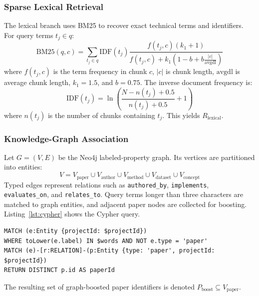 \documentclass[conference]{IEEEtran}
\begin{document}


\subsubsection{Sparse Lexical Retrieval}
The lexical branch uses BM25 to recover exact technical terms and identifiers. For query terms $t_j \in q$:
\begin{equation}
\mathrm{BM25}(q, c) = \sum_{t_j \in q} \mathrm{IDF}(t_j) \frac{f(t_j, c)(k_1 + 1)}{f(t_j, c) + k_1\left(1 - b + b\frac{|c|}{\mathrm{avgdl}}\right)}
\label{eq:bm25}
\end{equation}
where $f(t_j, c)$ is the term frequency in chunk $c$, $|c|$ is chunk length, $\mathrm{avgdl}$ is average chunk length, $k_1 = 1.5$, and $b = 0.75$. The inverse document frequency is:
\begin{equation}
\mathrm{IDF}(t_j) = \ln\left(\frac{N - n(t_j) + 0.5}{n(t_j) + 0.5} + 1\right)
\label{eq:idf}
\end{equation}
where $n(t_j)$ is the number of chunks containing $t_j$. This yields $R_{\mathrm{lexical}}$.

\subsubsection{Knowledge-Graph Association}
Let $G = (V, E)$ be the Neo4j labeled-property graph. Its vertices are partitioned into entities:
\begin{equation}
V = V_{\mathrm{paper}} \cup V_{\mathrm{author}} \cup V_{\mathrm{method}} \cup V_{\mathrm{dataset}} \cup V_{\mathrm{concept}}
\label{eq:vertices}
\end{equation}
Typed edges represent relations such as \texttt{authored\_by}, \texttt{implements}, \texttt{evaluates\_on}, and \texttt{relates\_to}. Query terms longer than three characters are matched to graph entities, and adjacent paper nodes are collected for boosting. Listing~\ref{lst:cypher} shows the Cypher query.

\begin{lstlisting}[language={},caption={Representative Neo4j Cypher traversal.},label={lst:cypher}]
MATCH (e:Entity {projectId: $projectId})
WHERE toLower(e.label) IN $words AND NOT e.type = 'paper'
MATCH (e)-[r:RELATION]-(p:Entity {type: 'paper', projectId: $projectId})
RETURN DISTINCT p.id AS paperId
\end{lstlisting}

The resulting set of graph-boosted paper identifiers is denoted $P_{\mathrm{boost}} \subseteq V_{\mathrm{paper}}$.
\end{document}
